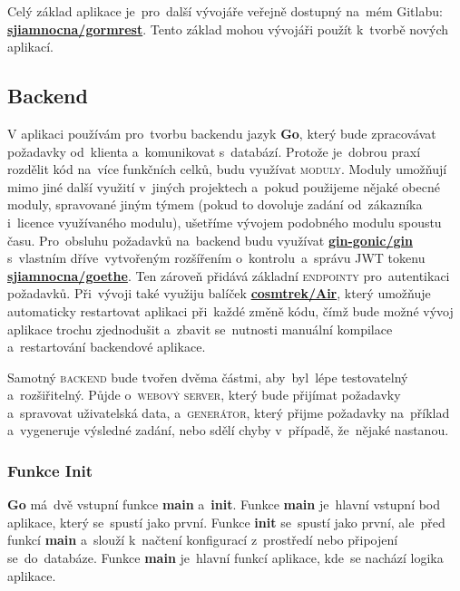 \documentclass[14pt,a4paper]{article}
\begin{document}
        Celý základ aplikace je~pro~další vývojáře veřejně dostupný na~mém Gitlabu: \href{https://gitlab.com/sjiamnocna/gormrest}{\textbf{sjiamnocna/gormrest}}. Tento základ mohou vývojáři použít k~tvorbě nových aplikací.
        
        \subsection{Backend}
            V aplikaci používám pro~tvorbu backendu jazyk \textbf{Go}, který bude zpracovávat požadavky od~klienta a~komunikovat s~databází.
            Protože je~dobrou praxí rozdělit kód na~více funkčních celků, budu využívat \textsc{moduly}. Moduly umožňují mimo jiné další využití v~jiných projektech a~pokud použijeme nějaké obecné moduly, spravované jiným týmem (pokud to dovoluje zadání od~zákazníka i~licence využívaného modulu), ušetříme vývojem podobného modulu spoustu času. \parencite{Zimmerman2023:howtowritebetter}
            Pro~obsluhu požadavků na~backend budu využívat \href{https://github.com/gin-gonic/gin}{\textbf{gin-gonic/gin}} s~vlastním dříve~vytvořeným rozšířením o~kontrolu~a~správu \textsc{JWT} tokenu \href{https://gitlab.com/sjiamnocna/goethe}{\textbf{sjiamnocna/goethe}}. Ten zároveň přidává základní \textsc{endpointy} pro~autentikaci požadavků.
            Při~vývoji také využiju balíček \href{https://github.com/cosmtrek/air}{\textbf{cosmtrek/Air}}, který umožňuje automaticky restartovat aplikaci při~každé změně kódu, čímž bude možné vývoj aplikace trochu zjednodušit a~zbavit se~nutnosti manuální kompilace a~restartování backendové aplikace.

            Samotný \textsc{backend} bude tvořen dvěma částmi, aby~byl~lépe testovatelný a~rozšiřitelný. Půjde o~\textsc{webový server}, který bude přijímat požadavky a~spravovat uživatelská data, a~\textsc{generátor}, který přijme požadavky na~příklad a~vygeneruje výsledné zadání, nebo sdělí chyby v~případě, že~nějaké nastanou.
            
            \subsubsection{Funkce Init}
            \textbf{Go} má~dvě vstupní funkce \textbf{main} a~\textbf{init}. Funkce \textbf{main} je~hlavní vstupní bod aplikace, který se~spustí jako první. Funkce \textbf{init} se~spustí jako první, ale~před funkcí \textbf{main} a~slouží k~načtení konfigurací z~prostředí nebo připojení se~do~databáze. Funkce \textbf{main} je~hlavní funkcí aplikace, kde~se nachází logika aplikace.
\end{document}
